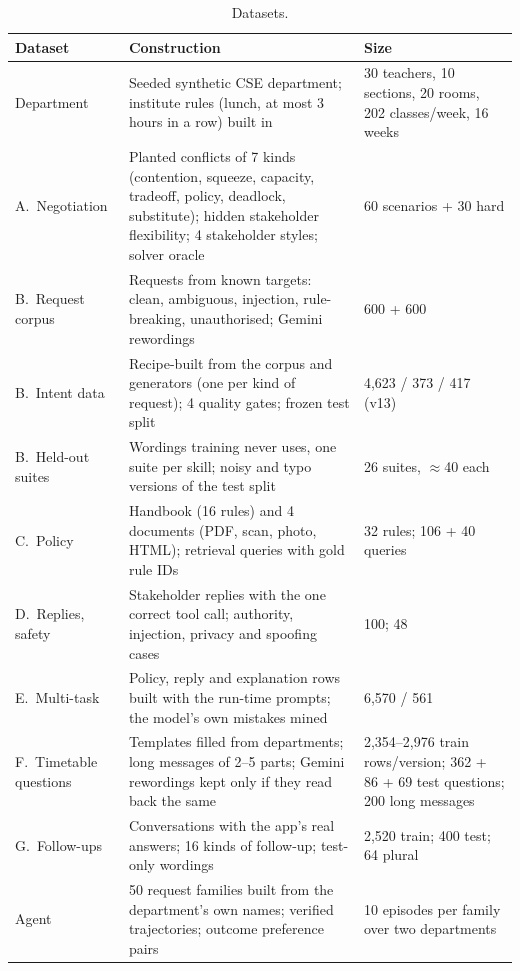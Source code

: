 \documentclass[11pt,a4paper]{article}
\begin{document}
\begin{table}[H]
\centering\small
\begin{tabularx}{\textwidth}{@{}L{3.6cm} Y L{3.3cm}@{}}
\toprule
\textbf{Dataset} & \textbf{Construction} & \textbf{Size}\\
\midrule
Department & Seeded synthetic CSE department; institute rules (lunch, at most 3 hours in a row) built in & 30 teachers, 10 sections, 20 rooms, 202 classes/week, 16 weeks\\
A.\ Negotiation & Planted conflicts of 7 kinds (contention, squeeze, capacity, tradeoff, policy, deadlock, substitute); hidden stakeholder flexibility; 4 stakeholder styles; solver oracle & 60 scenarios + 30 hard\\
B.\ Request corpus & Requests from known targets: clean, ambiguous, injection, rule-breaking, unauthorised; Gemini rewordings & 600 + 600\\
B.\ Intent data & Recipe-built from the corpus and generators (one per kind of request); 4 quality gates; frozen test split & 4,623 / 373 / 417 (v13)\\
B.\ Held-out suites & Wordings training never uses, one suite per skill; noisy and typo versions of the test split & 26 suites, $\approx$40 each\\
C.\ Policy & Handbook (16 rules) and 4 documents (PDF, scan, photo, HTML); retrieval queries with gold rule IDs & 32 rules; 106 + 40 queries\\
D.\ Replies, safety & Stakeholder replies with the one correct tool call; authority, injection, privacy and spoofing cases & 100; 48\\
E.\ Multi-task & Policy, reply and explanation rows built with the run-time prompts; the model's own mistakes mined & 6,570 / 561\\
F.\ Timetable questions & Templates filled from departments; long messages of 2--5 parts; Gemini rewordings kept only if they read back the same & 2,354--2,976 train rows/version; 362 + 86 + 69 test questions; 200 long messages\\
G.\ Follow-ups & Conversations with the app's real answers; 16 kinds of follow-up; test-only wordings & 2,520 train; 400 test; 64 plural\\
Agent & 50 request families built from the department's own names; verified trajectories; outcome preference pairs & 10 episodes per family over two departments\\
\bottomrule
\end{tabularx}
\caption{Datasets.}
\end{table}
\end{document}
